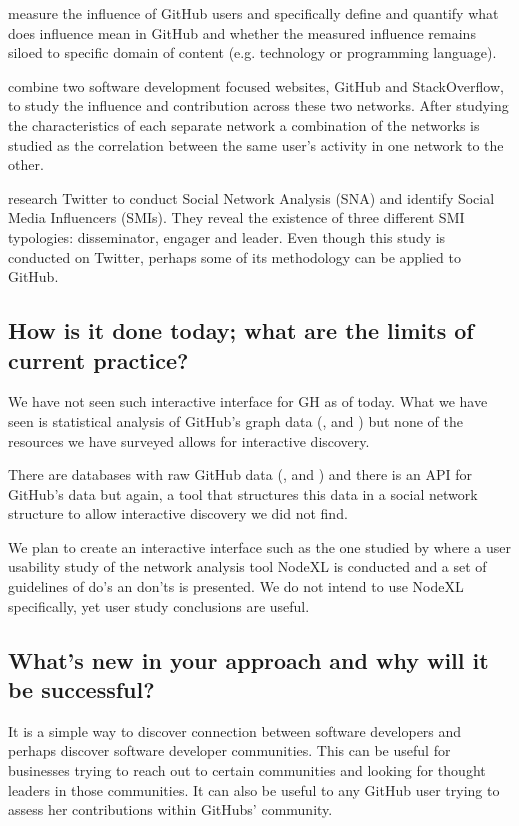 \documentclass[sigconf,11pt]{acmart}
\begin{document}
\citeauthor{measuring-user-influence-github}\cite{measuring-user-influence-github} measure the influence
of GitHub users and specifically define and quantify what does influence mean in GitHub and whether the measured
influence remains siloed to specific domain of content (e.g. technology or programming language).

\citeauthor{influence-github-stackoverflow}\cite{influence-github-stackoverflow} combine two software development
focused websites, GitHub and StackOverflow, to study the influence and contribution across these two networks.
After studying the characteristics of each separate network a combination of the networks is studied
as the correlation between the same user's activity in one network to the other.

\citeauthor{identifying-influences-in-the-internet-era}\cite{identifying-influences-in-the-internet-era} research
Twitter to conduct Social Network Analysis (SNA) and identify Social Media Influencers (SMIs).
They reveal the existence of three different SMI typologies: disseminator, engager and leader.
Even though this study is conducted on Twitter, perhaps some of its methodology can be applied to GitHub.

\subsection*{How is it done today; what are the limits of current practice?}
We have not seen such interactive interface for GH as of today.
What we have seen is statistical analysis of GitHub's graph data (\cite{coding-together},
\cite{influence-analysis-of-github-repositories} and \cite{collaboration-strength-metrics-github})
but none of the resources we have surveyed allows for interactive discovery.

There are databases with raw GitHub data (\cite{ghtorrent}, \cite{gharchive} and \cite{bq-gh})
and there is an API for GitHub's data\cite{gh-api} but again, a tool that structures this data
in a social network structure to allow interactive discovery we did not find.

We plan to create an interactive interface such as the one studied by \citeauthor{do-you-know-the-way-to-sna}\cite{do-you-know-the-way-to-sna}
where a user usability study of the network analysis tool NodeXL is conducted and a set of guidelines of do's an don'ts is presented.
We do not intend to use NodeXL specifically, yet user study conclusions are useful.

\subsection*{What's new in your approach and why will it be successful?}
It is a simple way to discover connection between software developers and perhaps discover software developer communities.
This can be useful for businesses trying to reach out to certain communities and looking for thought leaders in those communities.
It can also be useful to any GitHub user trying to assess her contributions within GitHubs' community.
\end{document}

